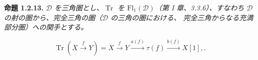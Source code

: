 \medskip
\noindent\textbf{命題 1.2.13.}\quad
\textit{$\mathcal D$ を三角圏とし、$\operatorname{Tr}$ を
$\mathrm{Fl}_1(\mathcal D)$（第 I 章、3.3.6）、すなわち
$\mathcal D$ の射の圏から、完全三角の圏（$\mathcal D$ の三角の圏における、
完全三角からなる充満部分圏）への関手とする。}

\[
  \operatorname{Tr}\!\left(X\xrightarrow{f}Y\right)
  =X\xrightarrow{f}Y\xrightarrow{a(f)}\tau(f)
  \xrightarrow{b(f)}X[1], .
\]
\endgroup
